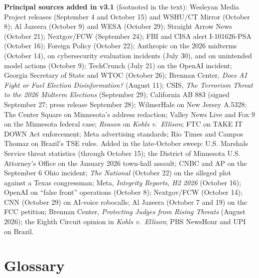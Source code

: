 \documentclass[11pt,letterpaper]{article}
\begin{document}
\textbf{Principal sources added in v3.1} (footnoted in the text): Wesleyan Media Project releases (September 4 and October 15) and WSHU/CT Mirror (October 8); Al Jazeera (October 9) and WESA (October 29); Straight Arrow News (October 21); Nextgov/FCW (September 24); FBI and CISA alert I-101626-PSA (October 16); Foreign Policy (October 22); Anthropic on the 2026 midterms (October 14), on cybersecurity evaluation incidents (July 30), and on unintended model actions (October 9); TechCrunch (July 21) on the OpenAI incident; Georgia Secretary of State and WTOC (October 26); Brennan Center, \textit{Does AI Fight or Fuel Election Disinformation?} (August 11); CSIS, \textit{The Terrorism Threat to the 2026 Midterm Elections} (September 29); California AB 883 (signed September 27; press release September 28); WilmerHale on New Jersey A.5328; The Center Square on Minnesota's address redaction; Valley News Live and Fox 9 on the Minnesota federal case; \textit{Reason} on \textit{Kohls v.\ Ellison}; FTC on TAKE IT DOWN Act enforcement; Meta advertising standards; Rio Times and Campos Thomaz on Brazil's TSE rules. Added in the late-October sweep: U.S. Marshals Service threat statistics (through October 15); the District of Minnesota U.S. Attorney's Office on the January 2026 town-hall assault; CNBC and AP on the September 6 Ohio incident; \textit{The National} (October 22) on the alleged plot against a Texas congressman; Meta, \textit{Integrity Reports, H2 2026} (October 16); OpenAI on ``false front'' operations (October 8); Nextgov/FCW (October 14); CNN (October 29) on AI-voice robocalls; Al Jazeera (October 7 and 19) on the FCC petition; Brennan Center, \textit{Protecting Judges from Rising Threats} (August 2026); the Eighth Circuit opinion in \textit{Kohls v.\ Ellison}; PBS NewsHour and UPI on Brazil.

\section{Glossary}
\end{document}
